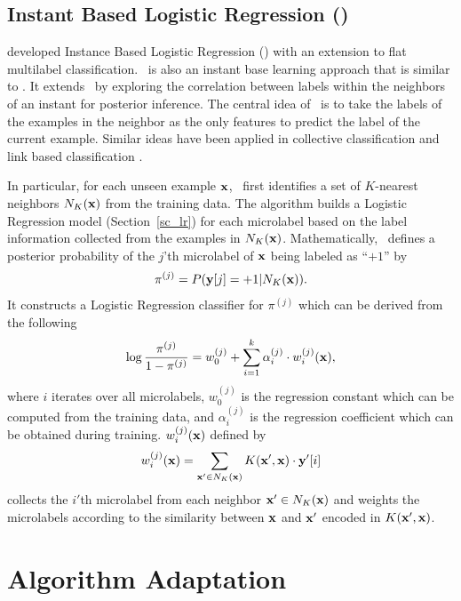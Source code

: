 {%
%
\subsection{Instant Based Logistic Regression (\iblr)} \label{sc_iblr}

\citet{Cheng09combining} developed Instance Based Logistic Regression (\iblr) with an extension to flat multilabel classification.
\iblr\ is also an instant base learning approach \citep{Aha91instance} that is similar to \mlknn.
It extends \mlknn\ by exploring the correlation between labels within the neighbors of an instant for posterior inference.
The central idea of \iblr\ is to take the labels of the examples in the neighbor as the only features to predict the label of the current example.
Similar ideas have been applied in collective classification \citep{Ghamrawi05collective} and link based classification \citep{Getoor05link, Getoor07introduction}.

In particular, for each unseen example $\mathbf {x}$, \iblr\ first identifies a set of $K$-nearest neighbors $N_K(\mathbf {x})$ from the training data.
The algorithm builds a Logistic Regression model (Section~\ref{sc_lr}) for each microlabel based on the label information collected from the examples in $N_K(\mathbf {x})$.
Mathematically, \iblr\ defines a posterior probability of the $j$'th microlabel of $\mathbf {x}$ being labeled as ``$+1$'' by
\begin{align*}
	\pi^{(j)} = P( \mathbf {y}[j]=+1 | N_K(\mathbf {x})).
\end{align*}
It constructs a Logistic Regression classifier for $\pi^{(j)}$ which can be derived from the following 
\begin{align*}
	\log\frac{\pi^{(j)}}{1-\pi^{(j)}} = w_0^{(j)} + \sum_{i=1}^{k}\alpha_i^{(j)}\cdot w_{i}^{(j)}(\mathbf {x}),
\end{align*}
where $i$ iterates over all microlabels, $w_0^{(j)}$ is the regression constant which can be computed from the training data, and $\alpha_i^{(j)}$ is the regression coefficient which can be obtained during training.
$w_i^{(j)}(\mathbf {x})$ defined by 
\begin{align*}
	w_i^{(j)}(\mathbf {x}) = \sum_{\mathbf {x}'\in N_K(\mathbf {x})}K(\mathbf {x}',\mathbf {x})\cdot \mathbf {y}'[i]
\end{align*}
collects the $i'$th microlabel from each neighbor $\mathbf {x}'\in N_K(\mathbf {x})$ and weights the microlabels according to the similarity between $\mathbf {x}$ and $\mathbf {x}'$ encoded in $K(\mathbf {x}',\mathbf {x})$.



%
%
\section{Algorithm Adaptation}

}
